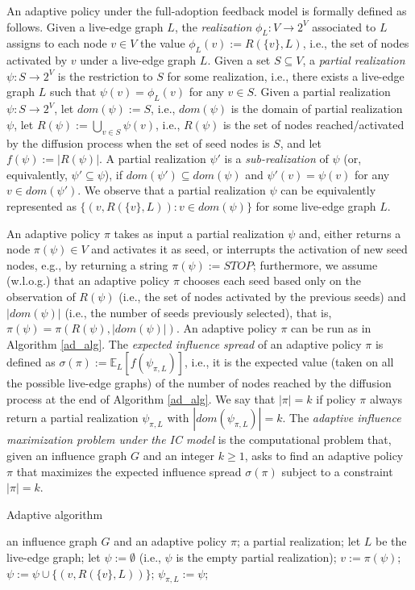 An adaptive policy under the full-adoption feedback model is formally defined as follows. Given a live-edge graph $L$, the {\em realization} $\phi_L:V\rightarrow 2^V$ associated to $L$ assigns to each node $v\in V$ the value $\phi_L(v):=R(\{v\},L)$, i.e., the set of nodes activated by $v$ under a live-edge graph $L$. Given a set $S\subseteq V$, a {\em partial realization} $\psi:S\rightarrow 2^V$ is the restriction to $S$ for some realization, i.e., there exists a live-edge graph $L$ such that $\psi(v)=\phi_L(v)$ for any $v\in S$. Given a partial realization $\psi:S\rightarrow 2^V$, let $dom(\psi):=S$, i.e., $dom(\psi)$ is the domain of  partial realization $\psi$, let $R(\psi):=\bigcup_{v\in S}\psi(v)$, i.e., $R(\psi)$ is the set of nodes reached/activated by the diffusion process when the set of seed nodes is $S$, and let $f(\psi):=|R(\psi)|$. A partial realization $\psi'$ is a {\em sub-realization} of $\psi$ (or, equivalently,  $\psi'\subseteq \psi$), if $dom(\psi')\subseteq dom(\psi)$ and $\psi'(v)=\psi(v)$ for any $v\in dom(\psi')$. We observe that a partial realization $\psi$ can be equivalently represented as $\{(v,R(\{v\},L)):v\in dom(\psi)\}$ for some live-edge graph $L$. 

An adaptive policy $\pi$ takes as input a partial realization $\psi$ and, either returns a node $\pi(\psi)\in V$ and activates it as seed, or interrupts the activation of new seed nodes, e.g., by returning a string $\pi(\psi):=STOP$; furthermore, we assume (w.l.o.g.) that an adaptive policy $\pi$ chooses each seed based only on the observation of $R(\psi)$ (i.e., the set of nodes activated by the previous seeds) and $|dom(\psi)|$ (i.e., the number of seeds previously selected), that is, $\pi(\psi)=\pi(R(\psi),|dom(\psi)|)$. An adaptive policy $\pi$ can be run as in Algorithm \ref{ad_alg}. The {\em expected influence spread} of an adaptive policy $\pi$ is defined as $\sigma(\pi):=\mathbb{E}_L[f(\psi_{\pi,L})]$, i.e., it is the expected value (taken on all the possible live-edge graphs) of the number of nodes reached by the diffusion process at the end of Algorithm \ref{ad_alg}. We say that $|\pi|=k$ if policy $\pi$ always return a partial realization $\psi_{\pi,L}$ with $|dom(\psi_{\pi,L})|=k$. The {\em adaptive influence maximization problem under the IC model} is the computational problem that, given an influence graph $G$ and an integer $k\geq 1$, asks to find an adaptive policy $\pi$ that maximizes the expected influence spread $\sigma(\pi)$ subject to a constraint $|\pi|=k$. 
\begin{algorithm}[ht]
	\caption{Adaptive algorithm}
	\label{ad_alg}
	\begin{algorithmic}[1]
		\REQUIRE an influence graph $G$ and an adaptive policy $\pi$;
		\ENSURE a partial realization;
		\STATE let $L$ be the live-edge graph;
		\STATE let $\psi:=\emptyset$ (i.e., $\psi$ is the empty partial realization);
		\STATE $v:=\pi(\psi)$;
		\STATE $\psi:=\psi\cup \{(v,R(\{v\},L))\}$;
		\ENDWHILE
		\RETURN $\psi_{\pi,L}:=\psi$;
	\end{algorithmic}
\end{algorithm}

